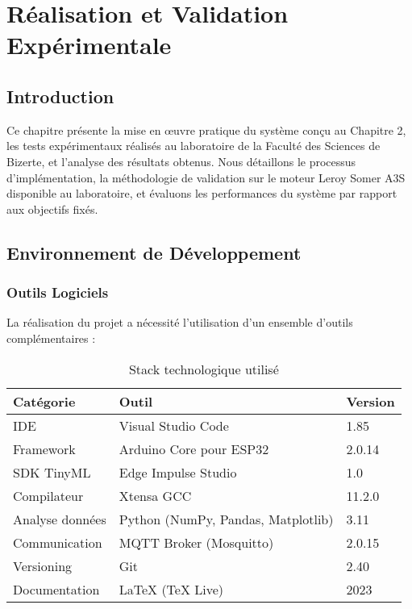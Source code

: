 \chapter{Réalisation et Validation Expérimentale}

\section{Introduction}

Ce chapitre présente la mise en œuvre pratique du système conçu au Chapitre 2, les tests expérimentaux réalisés au laboratoire de la Faculté des Sciences de Bizerte, et l'analyse des résultats obtenus. Nous détaillons le processus d'implémentation, la méthodologie de validation sur le moteur Leroy Somer A3S disponible au laboratoire, et évaluons les performances du système par rapport aux objectifs fixés.

\section{Environnement de Développement}

\subsection{Outils Logiciels}

La réalisation du projet a nécessité l'utilisation d'un ensemble d'outils complémentaires :

\begin{table}[h]
\centering
\caption{Stack technologique utilisé}
\begin{tabular}{lll}
\toprule
\textbf{Catégorie} & \textbf{Outil} & \textbf{Version} \\
\midrule
IDE & Visual Studio Code & 1.85 \\
Framework & Arduino Core pour ESP32 & 2.0.14 \\
SDK TinyML & Edge Impulse Studio & 1.0 \\
Compilateur & Xtensa GCC & 11.2.0 \\
Analyse données & Python (NumPy, Pandas, Matplotlib) & 3.11 \\
Communication & MQTT Broker (Mosquitto) & 2.0.15 \\
Versioning & Git & 2.40 \\
Documentation & LaTeX (TeX Live) & 2023 \\
\bottomrule
\end{tabular}
\end{table}

